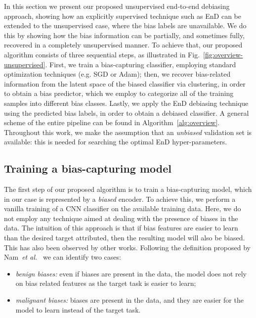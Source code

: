 \noindent In this section we present our proposed unsupervised end-to-end debiasing approach, showing how an explicitly supervised technique such as EnD can be extended to the unsupervised case, where the bias labels are unavailable. 
We do this by showing how the bias information can be partially, and sometimes fully, recovered in a completely unsupervised manner. 
To achieve that, our proposed algorithm consists of three sequential steps, as illustrated in Fig.~\ref{fig:overview-unsupervised}. 
First, we train a bias-capturing classifier, employing standard optimization techniques (e.g. SGD or Adam);  
then, we recover bias-related information from the latent space of the biased classifier via clustering, in order to obtain a bias predictor, which we employ to categorize all of the training samples into different bias classes. Lastly, we apply the EnD debiasing technique using the predicted bias labels, in order to obtain a debiased classifier.
A general scheme of the entire pipeline can be found in Algorithm~\ref{alg:overview}. 
Throughout this work, we make the assumption that an \emph{unbiased} validation set is available: this is needed for searching the optimal EnD hyper-parameters.


\subsection{Training a bias-capturing model}
\label{sec:phase1}
The first step of our proposed algorithm is to train a bias-capturing model, which in our case is represented by a \emph{biased} encoder. To achieve this, we perform a vanilla training of a CNN classifier on the available training data. Here, we do not employ any technique aimed at dealing with the presence of biases in the data. The intuition of this approach is that 
if bias features are easier to learn than the desired target attributed, then the resulting model will also be biased. This has also been observed by other works. Following the definition proposed by Nam~\emph{et al.}~\cite{nam2020learning} we can identify two cases:

\begin{itemize}
    \item \emph{benign biases:} even if biases are present in the data, the model does not rely on bias related features as the target task is easier to learn;
    \item \emph{malignant biases:} biases are present in the data, and they are easier for the model to learn instead of the target task.
\end{itemize}

